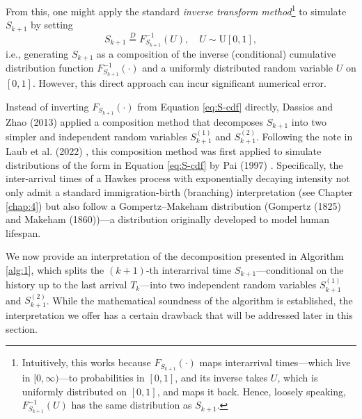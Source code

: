 \documentclass[12pt,a4paper]{report}
\theoremstyle{plain}
\theoremstyle{definition}
\theoremstyle{remark}
\newcommand{\1}{\mathbf{1}}
\begin{document}
\noindent
From this, one might apply the standard \emph{inverse transform method}\footnote{Intuitively, this works because $F_{S_{k+1}}(\cdot)$ maps interarrival times—which live in $[0,\infty)$—to probabilities in $[0,1]$, and its inverse takes $U$, which is uniformly distributed on $[0,1]$, and maps it back. Hence, loosely speaking, $F_{S_{k+1}}^{-1}(U)$ has the same distribution as $S_{k+1}$.} to simulate $S_{k+1}$ by setting
\[
S_{k+1} \stackrel{D}{=} F_{S_{k+1}}^{-1}(U), \quad U \sim \mathrm{U}[0,1],
\]
i.e., generating $S_{k+1}$ as a composition of the inverse (conditional) cumulative distribution function $F_{S_{k+1}}^{-1}(\cdot)$ and a uniformly distributed random variable $U$ on $[0, 1]$. However, this direct approach can incur significant numerical error.

\medskip
\noindent
Instead of inverting \( F_{S_{k+1}}(\cdot) \) from Equation \eqref{eq:S-cdf} directly, Dassios and Zhao (2013) \cite{DZ13} applied a composition method that decomposes \( S_{k+1} \) into two simpler and independent random variables \( S_{k+1}^{(1)} \) and \( S_{k+1}^{(2)} \). Following the note in Laub et al. (2022) \cite{LLT22}, this composition method was first applied to simulate distributions of the form in Equation \eqref{eq:S-cdf} by Pai (1997) \cite{Pai97}. Specifically, the inter-arrival times of a Hawkes process with exponentially decaying intensity not only admit a standard immigration-birth (branching) interpretation (see Chapter \ref{chap:4}) but also follow a Gompertz–Makeham distribution (Gompertz (1825) and Makeham (1860))—a distribution originally developed to model human lifespan.

\medskip
\noindent
We now provide an interpretation of the decomposition presented in Algorithm \ref{alg:1}, which splits the \((k+1)\)-th interarrival time \(S_{k+1}\)—conditional on the history up to the last arrival \(T_k\)—into two independent random variables \(S_{k+1}^{(1)}\) and \(S_{k+1}^{(2)}\). While the mathematical soundness of the algorithm is established, the interpretation we offer has a certain drawback that will be addressed later in this section.
\end{document}
